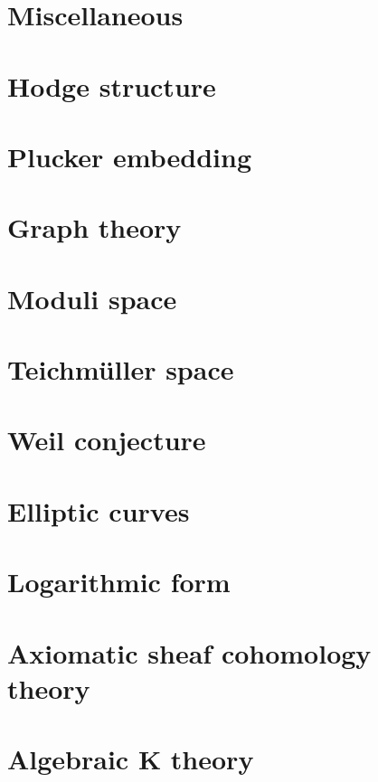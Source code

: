 \documentclass[main]{subfiles}
\begin{document}
\chapter{Miscellaneous}

\tableofcontents
\newpage

\chapter{Hodge structure}

\newpage

\chapter{Plucker embedding}

\newpage

\chapter{Graph theory}

\newpage

\chapter{Moduli space}

\newpage

\chapter{Teichm\"uller space}

\newpage

\chapter{Weil conjecture}

\newpage

\chapter{Elliptic curves}

\newpage

\chapter{Logarithmic form}

\newpage

\chapter{Axiomatic sheaf cohomology theory}

\newpage

\chapter{Algebraic K theory}

\newpage
\end{document}
